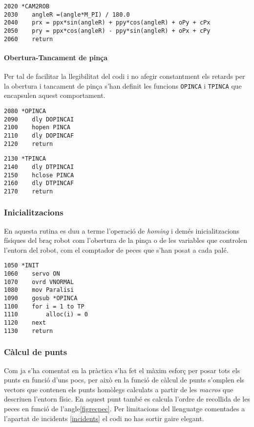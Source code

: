 \begin{verbatim}
2020 *CAM2ROB
2030 	angleR =(angle*M_PI) / 180.0
2040    prx = ppx*sin(angleR) + ppy*cos(angleR) + oPy + cPx
2050    pry = ppx*cos(angleR) - ppy*sin(angleR) + oPx + cPy
2060    return
\end{verbatim}

\paragraph{Obertura-Tancament de pinça}
Per tal de facilitar la llegibilitat del codi i no afegir constantment
els retards per la obertura i tancament de pinça s'han definit les funcions
\texttt{OPINCA} i \texttt{TPINCA} que encapsulen aquest comportament.

\begin{verbatim}
2080 *OPINCA
2090    dly DOPINCAI
2100    hopen PINCA
2110    dly DOPINCAF
2120    return
\end{verbatim}
\begin{verbatim}
2130 *TPINCA
2140    dly DTPINCAI
2150    hclose PINCA
2160    dly DTPINCAF
2170    return
\end{verbatim}

\subsubsection{Inicialitzacions}
En aquesta rutina es duu a terme l'operació de \emph{homing} i demés
inicialitzacions físiques del braç robot com l'obertura de la pinça
o de les variables que controlen l'entorn del robot, com el 
comptador de peces que s'han posat a cada palé.

\begin{verbatim}
1050 *INIT
1060    servo ON
1070    ovrd VNORMAL
1080    mov Paralisi
1090    gosub *OPINCA
1100    for i = 1 to TP
1110        alloc(i) = 0
1120    next
1130    return
\end{verbatim}

\subsubsection{Càlcul de punts}\label{codcalcpts}
Com ja s'ha comentat en la pràctica s'ha fet el màxim esforç per posar tots els
punts en funció d'uns pocs, per això en la funció de càlcul de punts s'omplen
els vectors que contenen els punts homòlegs calculats a partir de les
\emph{macros} que descriuen l'entorn físic. En aquest punt també es calcula
l'ordre de recollida de les peces en funció de l'angle\ref{figrecpec}. Per limitacions del
llenguatge comentades a l'apartat de incidents \ref{incidents} el codi no has
sortir gaire elegant.

